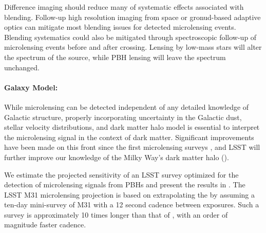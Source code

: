 Difference imaging should reduce many of systematic effects associated with blending. Follow-up high resolution imaging from space or gronud-based adaptive optics can mitigate most blending issues for detected microlensing events.
Blending systematics could also be mitigated through spectroscopic follow-up of microlensing events before and after crossing. Lensing by low-mass stars will alter the spectrum of the source, while PBH lensing will leave the spectrum unchanged.

\paragraph{Galaxy Model:} While microlensing can be detected independent of any detailed knowledge of Galactic structure, properly incorporating uncertainty in the Galactic dust, stellar velocity distributions, and dark matter halo model is essential to interpret the microlensing signal in the context of dark matter.
Significant improvements have been made on this front since the first microlensing surveys \citep[e.g.,][]{2018MNRAS.479.2889C}, and LSST will further improve our knowledge of the Milky Way's dark matter halo ().



We estimate the projected sensitivity of an LSST survey optimized for the detection of microlensing signals from PBHs and present the results in .
The LSST M31 microlensing projection is based on extrapolating the \citet{1701.02151} by assuming a ten-day mini-survey of M31 with a 12 second cadence between exposures.
Such a survey is approximately 10 times longer than that of \citet{1701.02151}, with an order of magnitude faster cadence.

